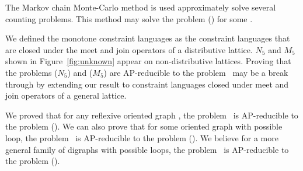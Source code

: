 The Markov chain Monte-Carlo method is used approximately solve several counting problems.
This method may solve the problem \ccsp(\mrelset) for some \mrelset\@.

We defined the monotone constraint languages as the constraint languages that
are closed under the meet and join operators of a distributive lattice.
\(N_5\) and \(M_5\) shown in Figure~\ref{fig:unknown} appear on non-distributive 
lattices. Proving that the problems \chom(\(N_5\)) and \chom(\(M_5\)) are AP-reducible to
the problem \cbis\ may be a break through by extending our result to
constraint languages closed under meet and join operators of a general lattice.

We proved that for any reflexive oriented graph \mH, the problem \cbis\ is
AP-reducible to the problem \chom(\mH). We can also prove that for some
oriented graph with possible loop, the problem \cbis\ is AP-reducible to 
the problem \chom(\mH). We believe for a more general family of digraphs
with possible loops, the problem \cbis\ is AP-reducible to the problem \chom(\mH).